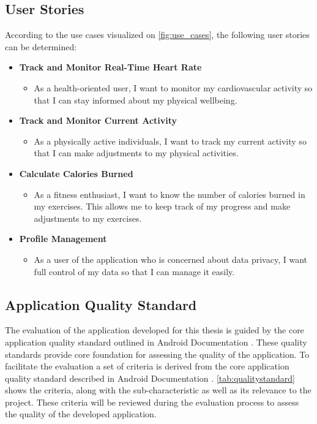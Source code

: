 \subsection{User Stories}
\label{chap:user_stories}
According to the use cases visualized on \autoref{fig:use_cases}, the following user stories can be determined:

\begin{itemize}[label={},leftmargin=*]
    \item \textbf{Track and Monitor Real-Time Heart Rate}
      \begin{itemize}[label={},leftmargin=*]
        \item As a health-oriented user, I want to monitor my cardiovascular activity so that I can stay informed about my physical wellbeing.
      \end{itemize}

    \item \textbf{Track and Monitor Current Activity}
      \begin{itemize}[label={},leftmargin=*]
        \item As a physically active individuals, I want to track my current activity so that I can make adjustments to my physical activities.
      \end{itemize}

    \item \textbf{Calculate Calories Burned}
      \begin{itemize}[label={},leftmargin=*]
        \item As a fitness enthusiast, I want to know the number of calories burned in my exercises. This allows me to keep track of my progress and make adjustments to my exercises.
      \end{itemize}  

    \item \textbf{Profile Management}
      \begin{itemize}[label={},leftmargin=*]
        \item As a user of the application who is concerned about data privacy, I want full control of my data so that I can manage it easily. 
      \end{itemize}
  \end{itemize}


\subsection{Application Quality Standard}
The evaluation of the application developed for this thesis is guided by the core application quality standard outlined in Android Documentation \autocite{androidqualityguidelines}. These quality standards provide core foundation for assessing the quality of the application. 
To facilitate the evaluation a set of criteria is derived from the core application quality standard described in Android Documentation \autocite{androidqualityguidelines}. \autoref{tab:qualitystandard} shows the criteria, along with the sub-characteristic as well as its relevance to the project. These criteria will be reviewed during the evaluation process to assess the quality of the developed application.
